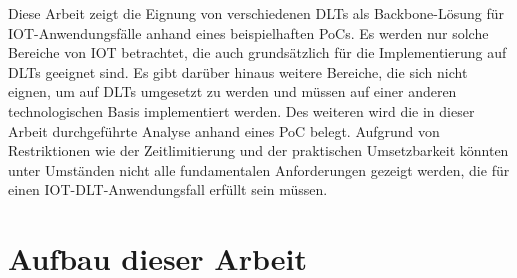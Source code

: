 Diese Arbeit zeigt die Eignung von verschiedenen DLTs als Backbone-Lösung für IOT-Anwendungsfälle anhand eines beispielhaften PoCs. Es werden nur solche Bereiche von IOT betrachtet, die auch grundsätzlich für die Implementierung auf DLTs geeignet sind. Es gibt darüber hinaus weitere Bereiche, die sich nicht eignen, um auf DLTs umgesetzt zu werden und müssen auf einer anderen technologischen Basis implementiert werden. Des weiteren wird die in dieser Arbeit durchgeführte Analyse anhand eines PoC belegt. Aufgrund von Restriktionen wie der Zeitlimitierung und der praktischen Umsetzbarkeit könnten unter Umständen nicht alle fundamentalen Anforderungen gezeigt werden, die für einen IOT-DLT-Anwendungsfall erfüllt sein müssen.


%
%
\section{Aufbau dieser Arbeit}
\label{sec:intro:structure}
\lipsum[1-1]
